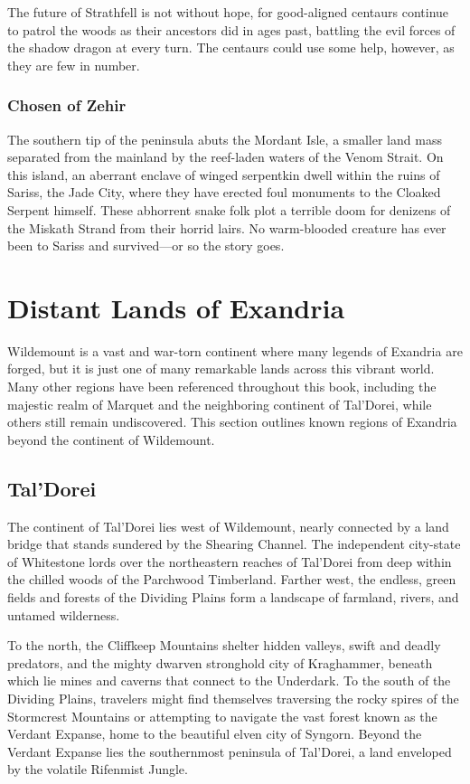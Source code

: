 \documentclass[10pt,a4paper,twoside,bg=print,twocolumn,openany,nodeprecatedcode]{dndbook}
\begin{document}
The future of Strathfell is not without hope, for good-aligned centaurs continue to patrol the woods as their ancestors did in ages past, battling the evil forces of the shadow dragon at every turn. The centaurs could use some help, however, as they are few in number.

\subsubsection{Chosen of Zehir}
The southern tip of the peninsula abuts the Mordant Isle, a smaller land mass separated from the mainland by the reef-laden waters of the Venom Strait. On this island, an aberrant enclave of winged serpentkin dwell within the ruins of Sariss, the Jade City, where they have erected foul monuments to the Cloaked Serpent himself. These abhorrent snake folk plot a terrible doom for denizens of the Miskath Strand from their horrid lairs. No warm-blooded creature has ever been to Sariss and survived—or so the story goes.

\section{Distant Lands of Exandria}
Wildemount is a vast and war-torn continent where many legends of Exandria are forged, but it is just one of many remarkable lands across this vibrant world. Many other regions have been referenced throughout this book, including the majestic realm of Marquet and the neighboring continent of Tal'Dorei, while others still remain undiscovered. This section outlines known regions of Exandria beyond the continent of Wildemount.

\subsection{Tal'Dorei}
The continent of Tal'Dorei lies west of Wildemount, nearly connected by a land bridge that stands sundered by the Shearing Channel. The independent city-state of Whitestone lords over the northeastern reaches of Tal'Dorei from deep within the chilled woods of the Parchwood Timberland. Farther west, the endless, green fields and forests of the Dividing Plains form a landscape of farmland, rivers, and untamed wilderness.

To the north, the Cliffkeep Mountains shelter hidden valleys, swift and deadly predators, and the mighty dwarven stronghold city of Kraghammer, beneath which lie mines and caverns that connect to the Underdark. To the south of the Dividing Plains, travelers might find themselves traversing the rocky spires of the Stormcrest Mountains or attempting to navigate the vast forest known as the Verdant Expanse, home to the beautiful elven city of Syngorn. Beyond the Verdant Expanse lies the southernmost peninsula of Tal'Dorei, a land enveloped by the volatile Rifenmist Jungle.
\end{document}
